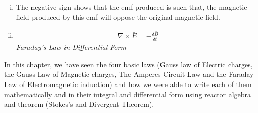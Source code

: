 \begin{mdframed}[backgroundcolor=lightblue, linewidth=1pt, hidealllines=true]
\begin{enumerate}[(i)]
	\item The negative sign shows that the emf produced is such that, the magnetic field produced by this emf will oppose the original magnetic field. 
	
	\item 
	\begin{align*}
		\nabla \times \bar{E} = -\frac{\delta \bar{B}}{\delta t}
	\end{align*}
	\emph{Faraday's Law in Differential Form}
\end{enumerate}
    In this chapter, we have seen the four basic laws (Gauss law of Electric charges, the Gauss Law of Magnetic charges, The Amperes Circuit Law and the Faraday Law of Electromagnetic induction) and how we were able to write each of them mathematically and in their integral and differential form using reactor algebra and theorem (Stokes's and Divergent Theorem).
\end{mdframed}


